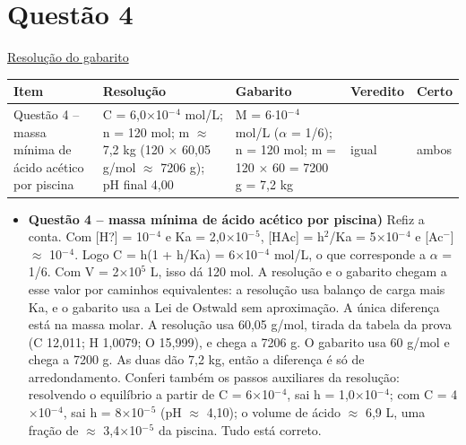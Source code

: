 \documentclass{article}%
\begin{document}
\section*{Questão 4}%
\href{https://poliedroresolve.sistemapoliedro.com.br/vestibulares/ime/2026/ime-2-fase-dia-3-25-10-2025-2-fase-dia-3/dissertativa-4-quimica-2-fase-dia-3-ime-2026}{Resolução do gabarito}\par\smallskip%
\begin{longtable}{@{}p{} p{} p{} p{} p{}@{}}\toprule Item & Resolução & Gabarito & Veredito & Certo \\ \midrule
Questão 4 -- massa mínima de ácido acético por piscina & C = 6,0$\times$10$^{-}$$^{4}$ mol/L; n = 120 mol; m $\approx$ 7,2 kg (120 $\times$ 60,05 g/mol $\approx$ 7206 g); pH final 4,00 & M = 6$\cdot$10$^{-}$$^{4}$ mol/L ($\alpha$ = 1/6); n = 120 mol; m = 120 $\times$ 60 = 7200 g = 7,2 kg & igual & ambos \\
\bottomrule\end{longtable}%
\begin{itemize}%
\item%
\textbf{Questão 4 -- massa mínima de ácido acético por piscina)} Refiz a conta. Com {[}H?{]} = 10$^{-}$$^{4}$ e Ka = 2,0$\times$10$^{-}$$^{5}$, {[}HAc{]} = h$^2$/Ka = 5$\times$10$^{-}$$^{4}$ e {[}Ac$^{-}${]} $\approx$ 10$^{-}$$^{4}$. Logo C = h(1 + h/Ka) = 6$\times$10$^{-}$$^{4}$ mol/L, o que corresponde a $\alpha$ = 1/6. Com V = 2$\times$10$^{5}$ L, isso dá 120 mol. A resolução e o gabarito chegam a esse valor por caminhos equivalentes: a resolução usa balanço de carga mais Ka, e o gabarito usa a Lei de Ostwald sem aproximação. A única diferença está na massa molar. A resolução usa 60,05 g/mol, tirada da tabela da prova (C 12,011; H 1,0079; O 15,999), e chega a 7206 g. O gabarito usa 60 g/mol e chega a 7200 g. As duas dão 7,2 kg, então a diferença é só de arredondamento. Conferi também os passos auxiliares da resolução: resolvendo o equilíbrio a partir de C = 6$\times$10$^{-}$$^{4}$, sai h = 1,0$\times$10$^{-}$$^{4}$; com C = 4$\times$10$^{-}$$^{4}$, sai h = 8$\times$10$^{-}$$^{5}$ (pH $\approx$ 4,10); o volume de ácido $\approx$ 6,9 L, uma fração de $\approx$ 3,4$\times$10$^{-}$$^{5}$ da piscina. Tudo está correto.%
\end{itemize}%
\end{document}
